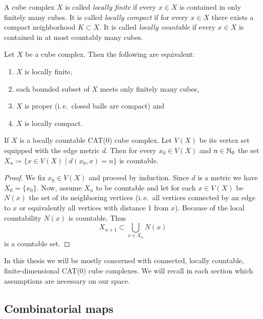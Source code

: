 \begin{defin}
  A cube complex \(X\) is called \emph{locally finite} if every \(x \in X\) is contained in only finitely many cubes. It is called \emph{locally compact} if for every \(x \in X\) there exists a compact neighborhood \(K \subset X\). It is called \emph{locally countable} if every \(x \in X\) is contained in at most countably many cubes.
\end{defin}

\begin{prop}
  Let \(X\) be a cube complex. Then the following are equivalent:
  \begin{enumerate}
  \item \(X\) is locally finite,
  \item each bounded subset of \(X\) meets only finitely many cubes,
  \item \(X\) is proper (i.\,e.\ closed balls are compact) and
  \item \(X\) is locally compact.
  \end{enumerate}
\end{prop}

\begin{lemma}
  \label{lem:lf-countable}
  If \(X\) is a locally countable CAT(0) cube complex. Let \(V(X)\) be its vertex set equipped with the edge metric \(d\). Then for every \(x_0 \in V(X)\) and \(n \in \mathbb{N}_0\) the set \(X_n \coloneqq \{x \in V(X) \mid d(x_0, x) = n\}\) is countable.
\end{lemma}

\begin{proof}
  We fix \(x_0 \in V(X)\) and proceed by induction. Since \(d\) is a metric we have \(X_0 = \{x_0\}\). Now, assume \(X_n\) to be countable and let for each \(x \in V(X)\) be \(N(x)\) the set of its neighboring vertices (i.\,e.\ all vertices connected by an edge to \(x\) or equivalently all vertices with distance 1 from \(x\)). Because of the local countability \(N(x)\) is countable. Thus
  \[
    X_{n+1} \subset \bigcup_{x \in X_n} N(x)
  \]
  is a countable set.
\end{proof}

\begin{rem}
  In this thesis we will be mostly concerned with connected, locally countable, finite-dimensional CAT(0) cube complexes. We will recall in each section which assumptions are necessary on our space.
\end{rem}

\subsection{Combinatorial maps}
\label{sec:comb-map}

